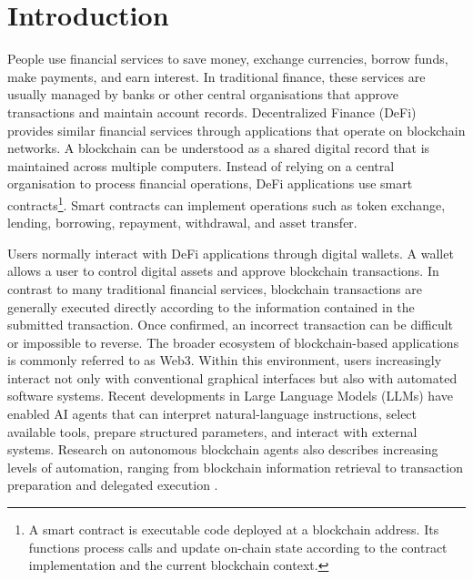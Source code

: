 \chapter{Introduction}
\label{chap:introduction}



People use financial services to save money, exchange currencies, borrow funds, make
payments, and earn interest. In traditional finance, these services are usually managed
by banks or other central organisations that approve transactions and maintain account
records. Decentralized Finance (DeFi) provides similar financial services through applications that operate on blockchain networks. A blockchain can be understood as a shared digital record that is maintained across multiple computers. Instead of relying on a central organisation to process financial operations, DeFi applications use smart contracts\footnote{A smart contract is executable code deployed at a blockchain address. Its functions process calls and update on-chain state according to the contract implementation and the current blockchain context.}. Smart contracts can implement operations such as token exchange, lending, borrowing, repayment, withdrawal, and asset transfer.

Users normally interact with DeFi applications through digital wallets. A wallet allows a user to control digital assets and approve blockchain transactions. In contrast to many traditional financial services, blockchain transactions are generally executed directly according to the information contained in the submitted transaction. Once confirmed, an incorrect transaction can be difficult or impossible to reverse. The broader ecosystem of blockchain-based applications is commonly referred to as Web3. Within this environment, users increasingly interact not only with conventional graphical interfaces but also with automated software systems. Recent developments in Large Language Models (LLMs) have enabled AI agents that can interpret natural-language instructions, select available tools, prepare structured parameters, and interact with external systems. Research on autonomous blockchain agents also describes increasing levels of automation, ranging from blockchain information retrieval to transaction preparation and delegated execution \cite{alqithamiAutonomousAgentsBlockchains2026}.

